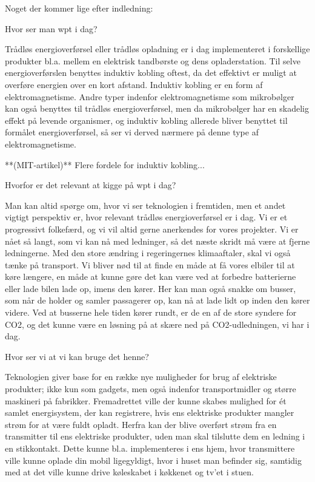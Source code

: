 Noget der kommer lige efter indledning:

Hvor ser man wpt i dag?

Trådløs energioverførsel eller trådløs opladning er i dag implementeret i forskellige produkter bl.a. mellem en elektrisk tandbørste og dens opladerstation. Til selve energioverførslen benyttes induktiv kobling oftest, da det effektivt er muligt at overføre energien over en kort afstand. Induktiv kobling er en form af elektromagnetisme. Andre typer indenfor elektromagnetisme som mikrobølger kan også benyttes til trådløs energioverførsel, men da mikrobølger har en skadelig effekt på levende organismer, og induktiv kobling allerede bliver benyttet til formålet energioverførsel, så ser vi derved nærmere på denne type af elektromagnetisme.

**(MIT-artikel)** Flere fordele for induktiv kobling...

Hvorfor er det relevant at kigge på wpt i dag?

Man kan altid spørge om, hvor vi ser teknologien i fremtiden, men et andet vigtigt perspektiv er, hvor relevant trådløs energioverførsel er i dag. Vi er et progressivt folkefærd, og vi vil altid gerne anerkendes for vores projekter. Vi er nået så langt, som vi kan nå med ledninger, så det næste skridt må være at fjerne ledningerne. Med den store ændring i regeringernes klimaaftaler, skal vi også tænke på transport. Vi bliver nød til at finde en måde at få vores elbiler til at køre længere, en måde at kunne gøre det kan være ved at forbedre batterierne eller lade bilen lade op, imens den kører. Her kan man også snakke om busser, som når de holder og samler passagerer op, kan nå at lade lidt op inden den kører videre. Ved at busserne hele tiden kører rundt, er de en af de store syndere for CO2, og det kunne være en løsning på at skære ned på CO2-udledningen, vi har i dag.

Hvor ser vi at vi kan bruge det henne?

Teknologien giver base for en række nye muligheder for brug af elektriske produkter; ikke kun som gadgets, men også indenfor transportmidler og større maskineri på fabrikker. Fremadrettet ville der kunne skabes mulighed for ét samlet energisystem, der kan registrere, hvis ens elektriske produkter mangler strøm for at være fuldt opladt. Herfra kan der blive overført strøm fra en transmitter til ens elektriske produkter, uden man skal tilslutte dem en ledning i en stikkontakt. Dette kunne bl.a. implementeres i ens hjem, hvor transmittere ville kunne oplade din mobil ligegyldigt, hvor i huset man befinder sig, samtidig med at det ville kunne drive køleskabet i køkkenet og tv'et i stuen.

